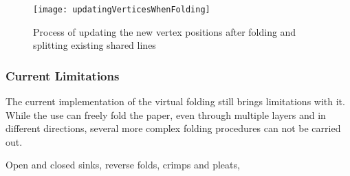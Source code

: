  \begin{figure}[htbp]
	\centering
	\texttt{[image: updatingVerticesWhenFolding]}
	\caption{Process of updating the new vertex positions after folding and splitting existing shared lines}
	\label{fig:updatingVerticesWhenFolding}
\end{figure}

\newpage
\subsubsection{Current Limitations}
\label{sec:virtualFoldingLimits}

The current implementation of the virtual folding still brings limitations with it. While the use can freely fold the paper, even through multiple layers and in different directions, several more complex folding procedures can not be carried out.

Open and closed sinks, reverse folds, crimps and pleats, 